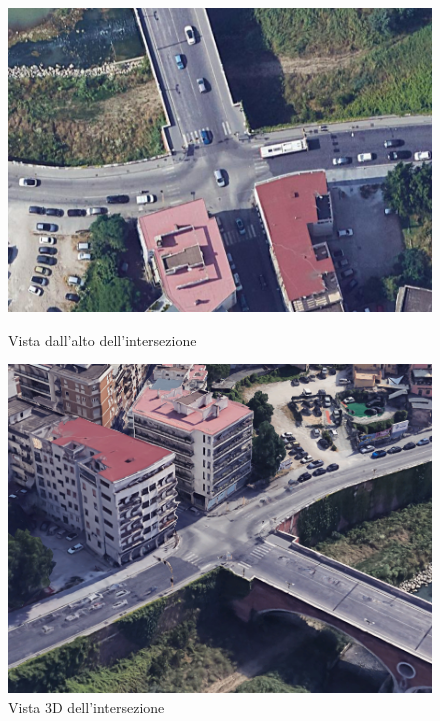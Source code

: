 \begin{figure}[H]
    \centering
    \begin{minipage}[b]{.45\textwidth}
        \centering
        \includegraphics[width=\textwidth]{figure/intersection/incrocio_top.png}
        \caption{Vista dall'alto dell'intersezione}
        \label{fig:intersection_top}
    \end{minipage}
    \hfill
    \begin{minipage}[b]{.45\textwidth}
        \centering
        \includegraphics[width=\textwidth]{figure/intersection/incrocio_3d.png}
        \caption{Vista 3D dell'intersezione}
        \label{fig:intersection_3d}
    \end{minipage}
\end{figure}

